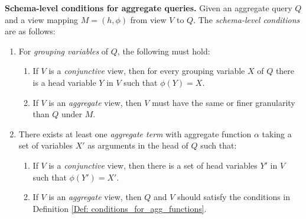 
\begin{definition}
{\bf Schema-level conditions for aggregate queries.}
Given an aggregate query $Q$ and %
 a view mapping $M = (h, \phi)$ from view $V$ to $Q$. The {\em schema-level conditions} are as follows:
\begin{enumerate}
\item For \textit{grouping variables} of $Q$, the following must hold:
\begin{enumerate}
\item If $V$ is a \textit{conjunctive} view, then for every grouping variable $X$ of $Q$ there is a head variable $Y$ in $V$ such that $\phi(Y) = X$.
\item If $V$ is an \textit{aggregate} view, then $V$ must have the same or finer granularity than $Q$ under $M$.
\end{enumerate}
\item There exists at least one \textit{aggregate term }with aggregate function $\alpha$ taking a set of variables $X'$ as arguments in the head of $Q$ such that:
\begin{enumerate}
\item If $V$ is a \textit{conjunctive} view, then there is a set of head variables $Y'$ in $V$ such that $\phi(Y') = X'$.
\item If $V$ is an \textit{aggregate} view, then $Q$ and $V$ should satisfy the conditions in Definition \ref{Def: conditions_for_agg_functions}.





\end{enumerate}
\end{enumerate}
\end{definition}

